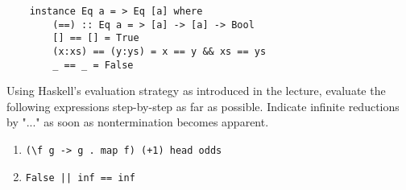 \documentclass{article}
\def\code#1{\texttt{#1}}
\begin{document}
\begin{enumerate}
\begin{multicols}{2}
\begin{verbatim}
    instance Eq a = > Eq [a] where
        (==) :: Eq a = > [a] -> [a] -> Bool
        [] == [] = True
        (x:xs) == (y:ys) = x == y && xs == ys
        _ == _ = False
        \end{verbatim}
        \end{multicols}
        Using Haskell's evaluation strategy as introduced in the lecture, evaluate the following expressions step-by-step as far as possible. Indicate infinite reductions by "..." as soon as nontermination becomes apparent.
        \begin{enumerate}
            \item \code{(\textbackslash f g -> g . map f) (+1) head odds}
            \item \code{False || inf == inf}
        \end{enumerate}
\end{enumerate}
\end{document}
